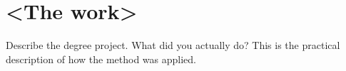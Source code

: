\chapter{<The work>}

Describe the degree project. What did you actually do? This is the practical description of how the method was applied.
